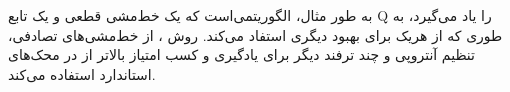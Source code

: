   به طور مثال، 
 الگوریتمی‌است که  یک خط‌مشی قطعی و یک تابع Q را یاد می‌گیرد،
 به طوری که از هریک  برای بهبود دیگری استفاد می‌کند. روش
 ،
   از خط‌مشی‌های تصادفی، تنظیم آنتروپی  و چند ترفند دیگر برای  یادگیری و کسب امتیاز بالاتر از 
    در محک‌های استاندارد
    استفاده می‌کند.


%
%
%

